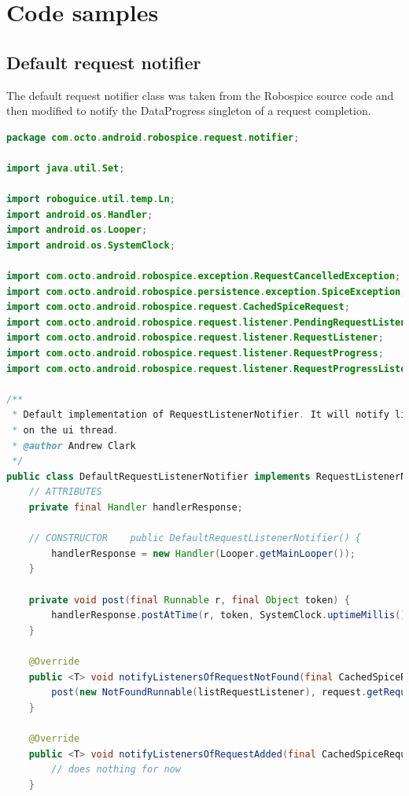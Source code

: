 \chapter{Code samples}

\section{Default request notifier}

The default request notifier class was taken from the Robospice source code and then modified to notify the DataProgress singleton of a request completion.

\begin{lstlisting}[language=java] 
 package com.octo.android.robospice.request.notifier;

import java.util.Set;

import roboguice.util.temp.Ln;
import android.os.Handler;
import android.os.Looper;
import android.os.SystemClock;

import com.octo.android.robospice.exception.RequestCancelledException;
import com.octo.android.robospice.persistence.exception.SpiceException;
import com.octo.android.robospice.request.CachedSpiceRequest;
import com.octo.android.robospice.request.listener.PendingRequestListener;
import com.octo.android.robospice.request.listener.RequestListener;
import com.octo.android.robospice.request.listener.RequestProgress;
import com.octo.android.robospice.request.listener.RequestProgressListener;

/**
 * Default implementation of RequestListenerNotifier. It will notify listeners
 * on the ui thread.
 * @author Andrew Clark
 */
public class DefaultRequestListenerNotifier implements RequestListenerNotifier {
    // ATTRIBUTES
    private final Handler handlerResponse;

    // CONSTRUCTOR    public DefaultRequestListenerNotifier() {
        handlerResponse = new Handler(Looper.getMainLooper());
    }

    private void post(final Runnable r, final Object token) {
        handlerResponse.postAtTime(r, token, SystemClock.uptimeMillis());
    }

    @Override
    public <T> void notifyListenersOfRequestNotFound(final CachedSpiceRequest<T> request, final Set<RequestListener<?>> listRequestListener) {
        post(new NotFoundRunnable(listRequestListener), request.getRequestCacheKey());
    }

    @Override
    public <T> void notifyListenersOfRequestAdded(final CachedSpiceRequest<T> request, Set<RequestListener<?>> listeners) {
        // does nothing for now
    }


\end{lstlisting}
